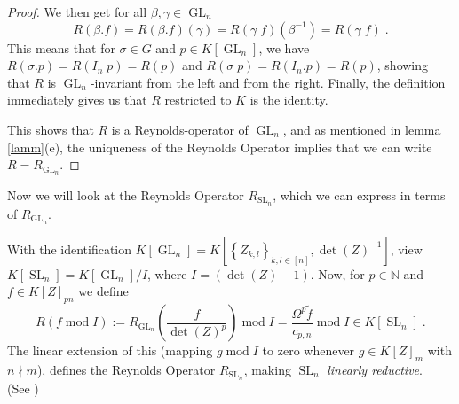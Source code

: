 \begin{proof}
  We then get for all $ \beta,\gamma \in \operatorname{GL}_n $
  \begin{equation*}
    R \left( \beta . f \right)
    = R \left( \beta . f \right) \left( \gamma \right) 
    = R \left( \gamma \dot{\phantom{.}} f \right) \left( \beta^{-1} \right) 
    = R \left( \gamma \dot{\phantom{.}} f \right) \; .
  \end{equation*}
  This means that for $\sigma \in G$ and $p \in K[\operatorname{GL}_n]$, we have $R(\sigma.p) = R(I_n\dot{\phantom{.}}p) = R(p)$ and $R(\sigma\dot{\phantom{.}}p) = R(I_n.p)=R(p)$, showing that $R$ is $\operatorname{GL}_n$-invariant from the left and from the right.
  Finally, the definition immediately gives us that $R$ restricted to $K$ is the identity.
  
  This shows that $R$ is a Reynolds-operator of $\operatorname{GL}_n$, and as mentioned in lemma \ref{lamm}(e), the uniqueness of the Reynolds Operator implies that we can write $ R = R_{\operatorname{GL}_n} $.
\end{proof}

Now we will look at the Reynolds Operator $R_{\operatorname{SL}_n}$, which we can express in terms of $R_{\operatorname{GL}_n}$.

\begin{corollary}\label{esel}
  With the identification $ K \left\lbrack \operatorname{GL}_n \right\rbrack = K \left\lbrack \left\{ Z_{k,l} \right\}_{k,l \in [ n ]} , \operatorname{det} (Z) ^{-1} \right\rbrack $, view $ K \left\lbrack \operatorname{SL}_n \right\rbrack = K \left\lbrack \operatorname{GL}_n \right\rbrack / I $, where $ I = \left( \operatorname{det} (Z) -1 \right) $.
  Now, for $ p \in \mathbb{N} $ and \linebreak$ f \in K \left\lbrack Z \right\rbrack_{pn} $ we define
  \begin{equation*}
    R ( f \operatorname{mod} I )
    := R_{\operatorname{GL}_n} \left( \frac{f}{\operatorname{det}(Z)^p} \right) \operatorname{mod} I
    = \frac{\Omega^p \tilde{f}}{c_{p,n}} \operatorname{mod} I \in K[\operatorname{SL}_n] \; .
  \end{equation*}
  The linear extension of this (mapping $g \operatorname{mod}I$ to zero whenever $g \in K \left\lbrack Z \right\rbrack_m$ with $n \nmid m$), defines the Reynolds Operator $R_{\operatorname{SL}_n}$, making $\operatorname{SL}_n$ \textit{linearly reductive}.  \\
  (See \cite[4.5.28]{DK15})
\end{corollary}

